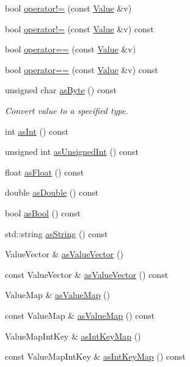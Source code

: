\begin{DoxyCompactItemize}
\item 
bool \hyperlink{classValue_aa790fa6ea9b22f72910403872b67dae4}{operator!=} (const \hyperlink{classValue}{Value} \&v)
\item 
bool \hyperlink{classValue_a33fc4197bb9458f053f7e8ee09716314}{operator!=} (const \hyperlink{classValue}{Value} \&v) const
\item 
bool \hyperlink{classValue_a27c03465fa8c9c2f54276679bb20094f}{operator==} (const \hyperlink{classValue}{Value} \&v)
\item 
bool \hyperlink{classValue_a9d9a4e78b513f3711060a5adeb044063}{operator==} (const \hyperlink{classValue}{Value} \&v) const
\item 
unsigned char \hyperlink{classValue_a67db4775eb08b887620175e2780ac061}{as\+Byte} () const
\begin{DoxyCompactList}\small\item\em Convert value to a specified type. \end{DoxyCompactList}\item 
int \hyperlink{classValue_ae2982ec4babf8754de5bcb2842f5127d}{as\+Int} () const
\item 
unsigned int \hyperlink{classValue_af7d3b1f00d25385ce608c3e7b6363f7b}{as\+Unsigned\+Int} () const
\item 
float \hyperlink{classValue_a5caa49c1bfacb7bd667e1fc0725cd737}{as\+Float} () const
\item 
double \hyperlink{classValue_abf6f3457cc800530c5a60bf2990ab6a7}{as\+Double} () const
\item 
bool \hyperlink{classValue_a3f49bd86a14537ca63f59297513e80eb}{as\+Bool} () const
\item 
std\+::string \hyperlink{classValue_af2125ceb5eb007b6cd6ab77666682117}{as\+String} () const
\item 
Value\+Vector \& \hyperlink{classValue_a4f26d85d7095500ade6344e2a7a80f38}{as\+Value\+Vector} ()
\item 
const Value\+Vector \& \hyperlink{classValue_a696b27df0fbf6a0b22fbfc7c054c34a7}{as\+Value\+Vector} () const
\item 
Value\+Map \& \hyperlink{classValue_a0039826aca674bf2f28e6063963bba29}{as\+Value\+Map} ()
\item 
const Value\+Map \& \hyperlink{classValue_a6a8dbc0909c6982921a7368eb7a6f27b}{as\+Value\+Map} () const
\item 
Value\+Map\+Int\+Key \& \hyperlink{classValue_a1bc5d0589acbca82e21f37280de61943}{as\+Int\+Key\+Map} ()
\item 
const Value\+Map\+Int\+Key \& \hyperlink{classValue_ada3362af0e99f76eeb99f75d1abf14c5}{as\+Int\+Key\+Map} () const

\end{DoxyCompactItemize}
